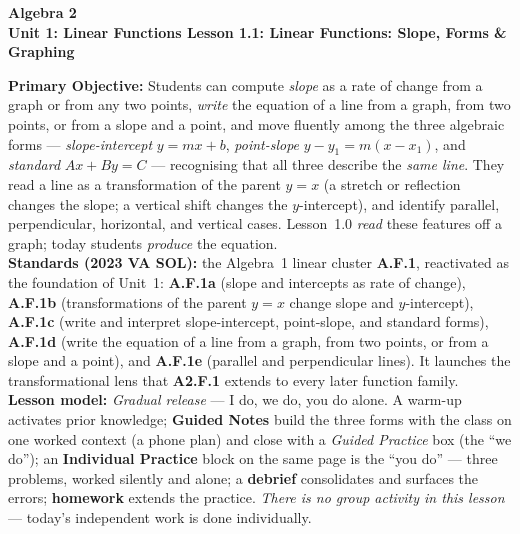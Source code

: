 \documentclass[10pt]{article}
\newcommand{\CourseName}{Algebra 2}
\newcommand{\UnitNumberName}{Unit 1: Linear Functions \quad}
\newcommand{\LessonNumberName}{Lesson 1.1: Linear Functions: Slope, Forms \& Graphing}
\begin{document}
\begin{center}
    {\Large\bfseries \CourseName \\
    {\small\bfseries \UnitNumberName \LessonNumberName}}
\end{center}

\begin{tcolorbox}[colback=forestbg, colframe=forest, boxrule=0.9pt, arc=2mm,
    left=2mm, right=2mm, top=1.5mm, bottom=1.5mm]
    \textbf{Primary Objective:} Students can compute \emph{slope} as a rate of change from a graph
    or from any two points, \emph{write} the equation of a line from a graph, from two points, or
    from a slope and a point, and move fluently among the three algebraic forms ---
    \emph{slope-intercept} $y=mx+b$, \emph{point-slope} $y-y_1=m(x-x_1)$, and \emph{standard}
    $Ax+By=C$ --- recognising that all three describe the \emph{same line}. They read a line as a
    transformation of the parent $y=x$ (a stretch or reflection changes the slope; a vertical shift
    changes the $y$-intercept), and identify parallel, perpendicular, horizontal, and vertical
    cases. Lesson~1.0 \emph{read} these features off a graph; today students \emph{produce} the
    equation.
    \\[2pt]
    \textbf{Standards (2023 VA SOL):} the Algebra~1 linear cluster \textbf{A.F.1}, reactivated as
    the foundation of Unit~1: \textbf{A.F.1a} (slope and intercepts as rate of change),
    \textbf{A.F.1b} (transformations of the parent $y=x$ change slope and $y$-intercept),
    \textbf{A.F.1c} (write and interpret slope-intercept, point-slope, and standard forms),
    \textbf{A.F.1d} (write the equation of a line from a graph, from two points, or from a slope
    and a point), and \textbf{A.F.1e} (parallel and perpendicular lines). It launches the
    transformational lens that \textbf{A2.F.1} extends to every later function family.
    \\[2pt]
    \textbf{Lesson model:} \emph{Gradual release} --- I do, we do, you do alone. A warm-up
    activates prior knowledge; \textbf{Guided Notes} build the three forms with the class on one
    worked context (a phone plan) and close with a \emph{Guided Practice} box (the ``we do''); an
    \textbf{Individual Practice} block on the same page is the ``you do'' --- three problems, worked
    silently and alone; a \textbf{debrief} consolidates and surfaces the errors; \textbf{homework}
    extends the practice. \emph{There is no group activity in this lesson} --- today's independent
    work is done individually.
\end{tcolorbox}
\end{document}
